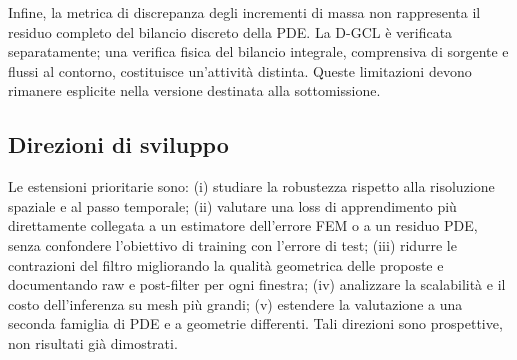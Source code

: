 Infine, la metrica di discrepanza degli incrementi di massa non rappresenta il residuo completo del bilancio discreto della PDE. La D-GCL è verificata separatamente; una verifica fisica del bilancio integrale, comprensiva di sorgente e flussi al contorno, costituisce un'attività distinta. Queste limitazioni devono rimanere esplicite nella versione destinata alla sottomissione.

\subsection{Direzioni di sviluppo}

Le estensioni prioritarie sono: (i) studiare la robustezza rispetto alla risoluzione spaziale e al passo temporale; (ii) valutare una loss di apprendimento più direttamente collegata a un estimatore dell'errore FEM o a un residuo PDE, senza confondere l'obiettivo di training con l'errore di test; (iii) ridurre le contrazioni del filtro migliorando la qualità geometrica delle proposte e documentando raw e post-filter per ogni finestra; (iv) analizzare la scalabilità e il costo dell'inferenza su mesh più grandi; (v) estendere la valutazione a una seconda famiglia di PDE e a geometrie differenti. Tali direzioni sono prospettive, non risultati già dimostrati.
